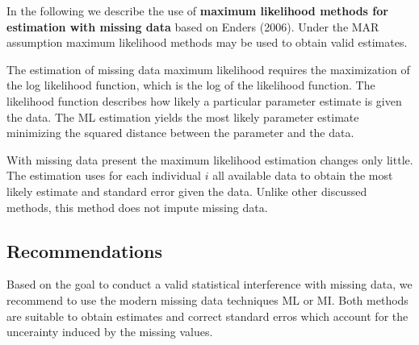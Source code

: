 In the following we describe the use of \textbf{maximum likelihood methods for estimation with missing data} based on Enders (2006). 
Under the MAR assumption maximum likelihood methods may be used to obtain valid estimates. \par
 The estimation of missing data maximum likelihood requires the maximization of the log likelihood function, which is the log of the likelihood function. The likelihood function describes how likely a particular parameter estimate is given the data. The ML estimation yields the most likely parameter estimate minimizing the squared distance between the parameter and the data. \par With missing data present the maximum likelihood estimation changes only little. The estimation uses for each individual $i$ all available data to obtain the most likely estimate and standard error given the data. Unlike other discussed methods, this method does not impute missing data. 
 \subsection{Recommendations}
 Based on the goal to conduct a valid statistical interference with missing data, we recommend to use the modern missing data techniques ML or MI. Both methods are suitable to obtain estimates and correct standard erros which account for the uncerainty induced by the missing values.


\endinput
